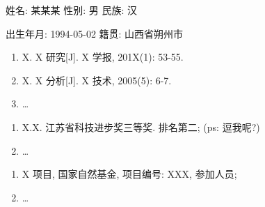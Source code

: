 


姓名: 某某某 \quad 性别: 男 \quad 民族: 汉 

出生年月: 1994-05-02 \quad 籍贯: 山西省朔州市


    \begin{enumerate}
        \item X. X 研究[J]. X 学报, 201X(1): 53-55.
        \item X. X 分析[J]. X 技术, 2005(5): 6-7.
        \item \dots
    \end{enumerate}

    \begin{enumerate}
        \item X.X. 江苏省科技进步奖三等奖. 排名第二; (ps: 逗我呢?)
        \item \dots
    \end{enumerate}

    \begin{enumerate}
        \item X 项目, 国家自然基金, 项目编号: XXX, 参加人员;
        \item \dots
    \end{enumerate}

\endinput
